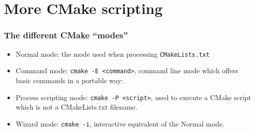 \documentclass[compress,slidestop,table,usepdftitle=false
              ]
               {beamer}
\newcommand{\fname}[1]{\texttt{#1}}
\begin{document}
\section{More CMake scripting}
\begin{frame}[fragile]
\frametitle{The different CMake ``modes''}
\begin{itemize}
\item Normal mode: the mode used when processing \fname{CMakeLists.txt}
\item Command mode: \fname{cmake -E <command>}, command line mode
      which offers basic commands in a portable way:

\item Process scripting mode: \fname{cmake -P <script>}, used to execute
      a CMake script which is not a CMakeLists.txt filename.

\item Wizard mode: \fname{cmake -i}, interactive equivalent of the Normal mode.
\end{itemize}
\end{frame}
\end{document}
